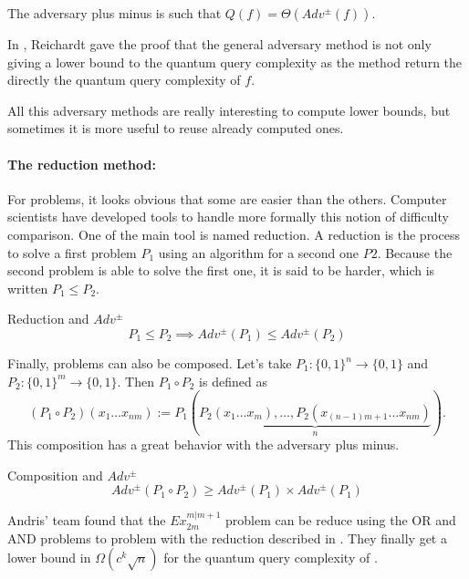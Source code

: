 \begin{itemize}
          \begin{theorem}
              The adversary plus minus is such that $Q(f) = \Theta(Adv^{\pm}(f))$.
          \end{theorem}

          In \cite{Reichardt_2009}, Reichardt gave the proof that the general adversary method
          is not only giving a lower bound to the quantum query complexity as the method
          return the directly the quantum query complexity of $f$.
\end{itemize}

All this adversary methods are really interesting to compute lower bounds,
but sometimes it is more useful to reuse already computed ones.


\paragraph*{\textbf{The reduction method:}}

For problems, it looks obvious that some are easier than the others.
Computer scientists have developed tools to handle more formally this
notion of difficulty comparison. One of the main tool is named reduction.
A reduction is the process to solve a first problem $P_1$ using an
algorithm for a second one $P2$. Because the second problem is able
to solve the first one, it is said to be harder, which is written
$P_1 \leq P_2$.

\begin{theorem}{Reduction and $Adv^{\pm}$}
    \[P_1 \leq P_2 \implies Adv^{\pm}(P_1) \leq Adv^{\pm}(P_2)\]
\end{theorem}

Finally, problems can also be composed. Let's take $P_1:\{0, 1\}^n \to \{0, 1\}$
and $P_2:\{0, 1\}^m \to \{0, 1\}$. Then $P_1 \circ P_2$ is defined as
\[(P_1 \circ P_2)(x_1 \ldots x_{nm}) := P_1\left(\underbrace{P_2(x_1\ldots x_m), \ldots, P_2(x_{(n-1)m+1}\ldots x_{nm})}_{n}\right).\]
This composition has a great behavior with the adversary plus minus.
\begin{theorem}{Composition and $Adv^{\pm}$}
    \[Adv^{\pm}(P_1 \circ P_2) \geq Adv^{\pm}(P_1)\times Adv^{\pm}(P_1)\]
\end{theorem}
Andris' team found that the $Ex_{2m}^{m\vert m+1}$ problem can be
reduce using the OR and AND problems to  problem with the
reduction described in \cite{art:2DGrid}. They finally get a lower
bound in $\Omega(c^k\sqrt{n})$ for the quantum query complexity of
.

